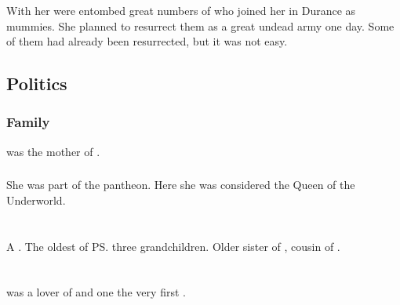 With her were entombed great numbers of \ophidians who joined her in Durance as mummies. 
She planned to resurrect them as a great undead army one day. 
Some of them had already been resurrected, but it was not easy. 









\subsection{Politics}





\subsubsection{Family}
\Thessulax was the mother of . 





\subsubsection{\Taortha}
She was part of the \taortha pantheon.
Here she was considered the Queen of the Underworld. 
















\section{\Thiencaste}
\index{\Thiencaste}
A \dragon. 
The oldest of \ps{\QuessanthIshnaruchaefir} three grandchildren. 
Older sister of \Tentocoth, cousin of \Rathyon. 















\section[Tyrasshana]{\TyarithXserasshana}
\index{\TyarithXserasshana}
\TyarithXserasshana{} was a lover of \Sethicus and one the very first \dragons. 

